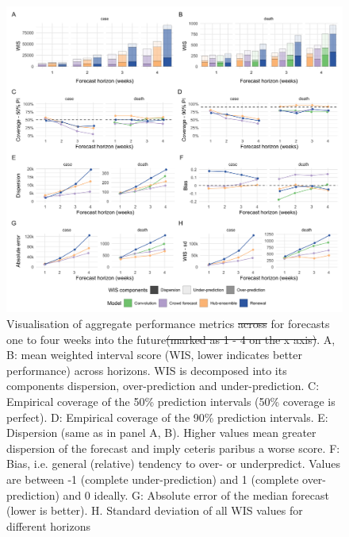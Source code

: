 \documentclass[
]{article}
\providecommand{\DIFdeltex}[1]{{\protect\color{red}\sout{#1}}}                      %
\providecommand{\DIFdelFL}[1]{\DIFdel{#1}} %
\providecommand{\DIFdelbeginFL}{} %
\providecommand{\DIFdelendFL}{} %
\providecommand{\DIFdel}[1]{\texorpdfstring{\DIFdeltex{#1}}{}} %
\newcommand{\DIFscaledelfig}{0.5}
\newlength{\DIFdelgraphicswidth} %
\newlength{\DIFdelgraphicsheight} %
\newcommand{\DIFdelincludegraphics}[2][]{%
\sbox{\DIFdelgraphicsbox}{\DIFOincludegraphics[#1]{#2}}%
\settoboxwidth{\DIFdelgraphicswidth}{\DIFdelgraphicsbox} %
\settoboxtotalheight{\DIFdelgraphicsheight}{\DIFdelgraphicsbox} %
\scalebox{\DIFscaledelfig}{%
\parbox[b]{\DIFdelgraphicswidth}{\usebox{\DIFdelgraphicsbox}\\[-\baselineskip] \rule{\DIFdelgraphicswidth}{0em}}\llap{\resizebox{\DIFdelgraphicswidth}{\DIFdelgraphicsheight}{%
\setlength{\unitlength}{\DIFdelgraphicswidth}%
\begin{picture}(1,1)%
\thicklines\linethickness{2pt} %
{\color[rgb]{1,0,0}\put(0,0){\framebox(1,1){}}}%
{\color[rgb]{1,0,0}\put(0,0){\line( 1,1){1}}}%
{\color[rgb]{1,0,0}\put(0,1){\line(1,-1){1}}}%
\end{picture}%
}\hspace*{3pt}}} %
} %
\DeclareRobustCommand{\DIFdelbeginFL}{\DIFOdelbeginFL \let\includegraphics\DIFdelincludegraphics} %
\DeclareRobustCommand{\DIFdelendFL}{\DIFOaddendFL \let\includegraphics\DIFOincludegraphics} %
\begin{document}
\begin{figure}[H]
\includegraphics[width=1\linewidth,]{../analysis/plots/aggregate-performance-all-v4} \caption{Visualisation of aggregate performance metrics \DIFdelbeginFL \DIFdelFL{across }\DIFdelendFL for forecasts one to four weeks into the future\DIFdelbeginFL \DIFdelFL{(marked as 1 - 4 on the x axis)}\DIFdelendFL . A, B: mean weighted interval score (WIS, lower indicates better performance) across horizons. WIS is decomposed into its components dispersion, over-prediction and under-prediction. C: Empirical coverage of the 50\% prediction intervals (50\% coverage is perfect). D: Empirical coverage of the 90\% prediction intervals. E: Dispersion (same as in panel A, B). Higher values mean greater dispersion of the forecast and imply ceteris paribus a worse score. F: Bias, i.e. general (relative) tendency to over- or underpredict. Values are between -1 (complete under-prediction) and 1 (complete over-prediction) and 0 ideally. G: Absolute error of the median forecast (lower is better). H. Standard deviation of all WIS values for different horizons}\label{fig:agg-performance-all}
\end{figure}
\end{document}
